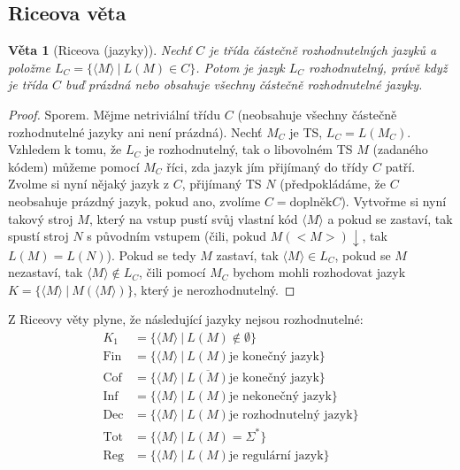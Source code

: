 \documentclass[11pt]{report} %
\newtheorem{theorem}{Věta}[section]
\numberwithin{equation}{section}
\begin{document}
\subsection{Riceova věta}
\begin{theorem}[Riceova (jazyky)]
	Nechť $C$ je třída částečně rozhodnutelných jazyků a položme $L_C = \{\langle M\rangle\ |\ L(M) \in C\}$. Potom je jazyk $L_C$ rozhodnutelný, právě když je třída $C$ buď prázdná nebo obsahuje všechny částečně rozhodnutelné jazyky.
\end{theorem}
\begin{proof}
	Sporem. Mějme netriviální třídu $C$ (neobsahuje všechny částečně rozhodnutelné jazyky ani není prázdná). Nechť $M_C$ je TS, $L_C = L(M_C)$. Vzhledem k tomu, že $L_C$ je rozhodnutelný, tak o libovolném TS $M$ (zadaného kódem) můžeme pomocí $M_C$ říci, zda jazyk jím přijímaný do třídy $C$ patří. Zvolme si nyní nějaký jazyk z $C$, přijímaný TS $N$ (předpokládáme, že $C$ neobsahuje prázdný jazyk, pokud ano, zvolíme $C = \text{doplněk} C$). Vytvořme si nyní takový stroj $M$, který na vstup pustí svůj vlastní kód $\langle M \rangle$ a pokud se zastaví, tak spustí stroj $N$ s původním vstupem (čili, pokud $M(<M>){\downarrow}$, tak $L(M) = L(N)$). Pokud se tedy $M$ zastaví, tak $\langle M\rangle \in L_C$, pokud se $M$ nezastaví, tak $\langle M\rangle \notin L_C$, čili pomocí $M_C$ bychom mohli rozhodovat jazyk $K=\{\langle M\rangle\ |\ M(\langle M\rangle)\}$, který je nerozhodnutelný.	
\end{proof}

Z Riceovy věty plyne, že následující jazyky nejsou rozhodnutelné:
\begin{align*}
	K_1  &= \{\langle M\rangle\ |\ L(M) \notin \emptyset\} \\
	\text{Fin} &= \{\langle M\rangle\ |\ L(M) \text{je konečný jazyk} \} \\
	\text{Cof} &= \{\langle M\rangle\ |\  \overline{L(M)} \text{je konečný jazyk} \} \\
	\text{Inf} &= \{\langle M\rangle\ |\  L(M) \text{je nekonečný jazyk}\} \\
	\text{Dec} &= \{\langle M\rangle\ |\  L(M) \text{je rozhodnutelný jazyk}\} \\
	\text{Tot} &= \{\langle M\rangle\ |\  L(M) = \Sigma^*\} \\
	\text{Reg} &= \{\langle M\rangle\ |\  L(M) \text{je regulární jazyk}\} \\
\end{align*}
\end{document}
